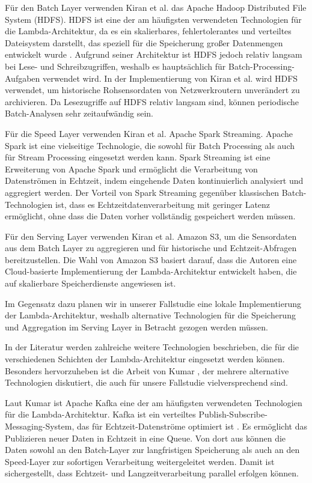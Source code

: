 Für den Batch Layer verwenden Kiran et al. \cite{kiran2015lambda} das Apache Hadoop Distributed File System (HDFS). HDFS ist eine der am häufigsten verwendeten Technologien für die Lambda-Architektur, da es ein skalierbares, fehlertolerantes und verteiltes Dateisystem darstellt, das speziell für die Speicherung großer Datenmengen entwickelt wurde \cite{ganelin2016spark}.
Aufgrund seiner Architektur ist HDFS jedoch relativ langsam bei Lese- und Schreibzugriffen, weshalb es hauptsächlich für Batch-Processing-Aufgaben verwendet wird. In der Implementierung von Kiran et al. wird HDFS verwendet, um historische Rohsensordaten von Netzwerkroutern unverändert zu archivieren. Da Lesezugriffe auf HDFS relativ langsam sind, können periodische Batch-Analysen sehr zeitaufwändig sein.

Für die Speed Layer verwenden Kiran et al. \cite{kiran2015lambda} Apache Spark Streaming. Apache Spark ist eine vielseitige Technologie, die sowohl für Batch Processing als auch für Stream Processing eingesetzt werden kann. Spark Streaming ist eine Erweiterung von Apache Spark und ermöglicht die Verarbeitung von Datenströmen in Echtzeit, indem eingehende Daten kontinuierlich analysiert und aggregiert werden.
Der Vorteil von Spark Streaming gegenüber klassischen Batch-Technologien ist, dass es Echtzeitdatenverarbeitung mit geringer Latenz ermöglicht, ohne dass die Daten vorher vollständig gespeichert werden müssen.

Für den Serving Layer verwenden Kiran et al. \cite{kiran2015lambda} Amazon S3, um die Sensordaten aus dem Batch Layer zu aggregieren und für historische und Echtzeit-Abfragen bereitzustellen. Die Wahl von Amazon S3 basiert darauf, dass die Autoren eine Cloud-basierte Implementierung der Lambda-Architektur entwickelt haben, die auf skalierbare Speicherdienste angewiesen ist.

Im Gegensatz dazu planen wir in unserer Fallstudie eine lokale Implementierung der Lambda-Architektur, weshalb alternative Technologien für die Speicherung und Aggregation im Serving Layer in Betracht gezogen werden müssen.

In der Literatur werden zahlreiche weitere Technologien beschrieben, die für die verschiedenen Schichten der Lambda-Architektur eingesetzt werden können. Besonders hervorzuheben ist die Arbeit von Kumar \cite{kumar2020lambda}, der mehrere alternative Technologien diskutiert, die auch für unsere Fallstudie vielversprechend sind.

Laut Kumar \cite{kumar2020lambda} ist Apache Kafka eine der am häufigsten verwendeten Technologien für die Lambda-Architektur. Kafka ist ein verteiltes Publish-Subscribe-Messaging-System, das für Echtzeit-Datenströme optimiert ist \cite{kreps2011kafka}. Es ermöglicht das Publizieren neuer Daten in Echtzeit in eine Queue. Von dort aus können die Daten sowohl an den Batch-Layer zur langfristigen Speicherung als auch an den Speed-Layer zur sofortigen Verarbeitung weitergeleitet werden. Damit ist sichergestellt, dass Echtzeit- und Langzeitverarbeitung parallel erfolgen können.

